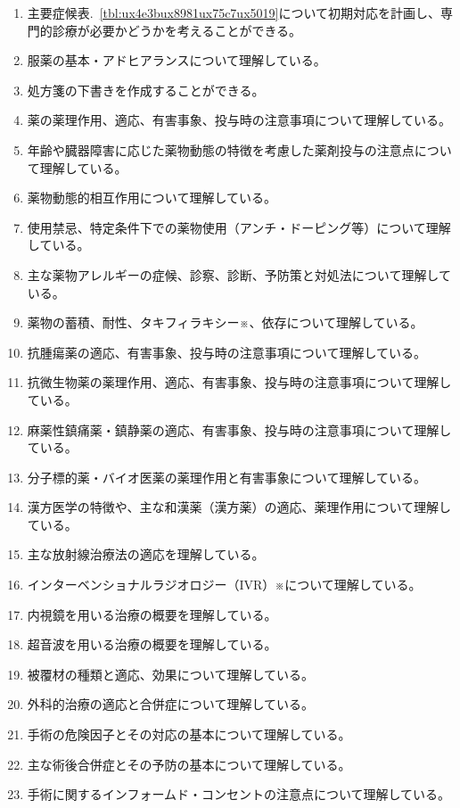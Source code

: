 \begin{enumerate}
\def\labelenumi{\arabic{enumi}.}
\tightlist
\item
  主要症候表.~\ref{tbl:ux4e3bux8981ux75c7ux5019}について初期対応を計画し、専門的診療が必要かどうかを考えることができる。
\item
  服薬の基本・アドヒアランスについて理解している。
\item
  処方箋の下書きを作成することができる。
\item
  薬の薬理作用、適応、有害事象、投与時の注意事項について理解している。
\item
  年齢や臓器障害に応じた薬物動態の特徴を考慮した薬剤投与の注意点について理解している。
\item
  薬物動態的相互作用について理解している。
\item
  使用禁忌、特定条件下での薬物使用（アンチ・ドーピング等）について理解している。
\item
  主な薬物アレルギーの症候、診察、診断、予防策と対処法について理解している。
\item
  薬物の蓄積、耐性、タキフィラキシー※、依存について理解している。
\item
  抗腫瘍薬の適応、有害事象、投与時の注意事項について理解している。
\item
  抗微生物薬の薬理作用、適応、有害事象、投与時の注意事項について理解している。
\item
  麻薬性鎮痛薬・鎮静薬の適応、有害事象、投与時の注意事項について理解している。
\item
  分子標的薬・バイオ医薬の薬理作用と有害事象について理解している。
\item
  漢方医学の特徴や、主な和漢薬（漢方薬）の適応、薬理作用について理解している。
\item
  主な放射線治療法の適応を理解している。
\item
  インターベンショナルラジオロジー（IVR）※について理解している。
\item
  内視鏡を用いる治療の概要を理解している。
\item
  超音波を用いる治療の概要を理解している。
\item
  被覆材の種類と適応、効果について理解している。
\item
  外科的治療の適応と合併症について理解している。
\item
  手術の危険因子とその対応の基本について理解している。
\item
  主な術後合併症とその予防の基本について理解している。
\item
  手術に関するインフォームド・コンセントの注意点について理解している。

\end{enumerate}
